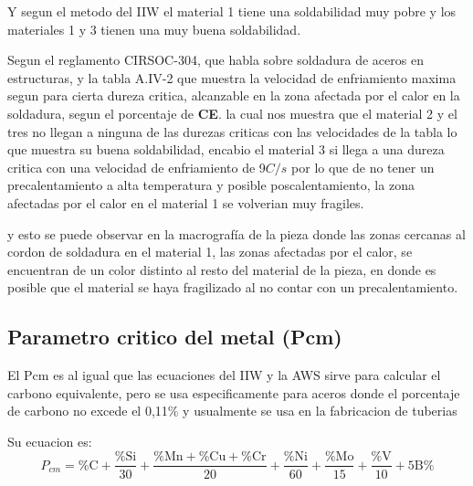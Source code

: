 \documentclass[12pt,a4paper]{article}
\begin{document}
Y segun el metodo del IIW el material 1 tiene una soldabilidad muy pobre y los materiales 1 y 3 tienen una muy buena soldabilidad.

Segun el reglamento CIRSOC-304, que habla sobre soldadura de aceros en estructuras, y la tabla A.IV-2 que muestra la velocidad de enfriamiento maxima segun para cierta dureza critica, alcanzable en la zona afectada por el calor en la soldadura, segun el porcentaje de \textbf{CE}. la cual nos muestra que el material 2 y el tres no llegan a ninguna de las durezas criticas con las velocidades de la tabla lo que muestra su buena soldabilidad, encabio el material 3 si llega a una dureza critica con una velocidad de enfriamiento de 9$C/s$ por lo que de no tener un precalentamiento a alta temperatura y posible poscalentamiento, la zona afectadas por el calor en el material 1 se volverian muy fragiles.

y esto se puede observar en la macrografía de la pieza donde las zonas cercanas al cordon de soldadura en el material 1, las zonas afectadas por el calor, se encuentran de un color distinto al resto del material de la pieza, en donde es posible que el material se haya fragilizado al no contar con un precalentamiento.

\subsection{Parametro critico del metal (Pcm)}
El Pcm es al igual que las ecuaciones del IIW y la AWS sirve para calcular el carbono equivalente, pero se usa especificamente para aceros donde el porcentaje de carbono no excede el 0,11\% y usualmente se usa en la fabricacion de tuberias

Su ecuacion es:
\begin{equation}
    P_{cm} = \text{\%C} + \frac{\text{\%Si}}{30} + \frac{\text{\%Mn}+\text{\%Cu}+\text{\%Cr}}{20} + \frac{\text{\%Ni}}{60} + \frac{\text{\%Mo}}{15} + \frac{\text{\%V}}{10} + \text{5B\%}
\end{equation}
\end{document}
